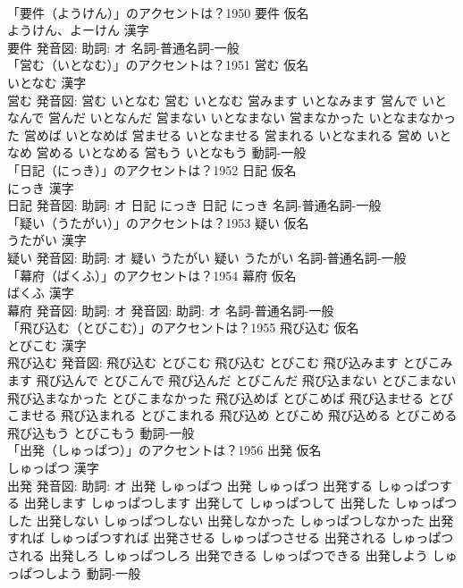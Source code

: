 \documentclass[8pt]{extreport}
\begin{document}
\begin{CJK}{UTF8}{min}
\\	「要件（ようけん）」のアクセントは？1950	要件 仮名　
\\	ようけん、よーけん 漢字　
\\	要件 発音図: 助詞: オ							名詞-普通名詞-一般 
\\	「営む（いとなむ）」のアクセントは？1951	営む 仮名　
\\	いとなむ 漢字　
\\	営む 発音図:	営む いとなむ		営む いとなむ 営みます いとなみます 営んで いとなんで 営んだ いとなんだ 営まない いとなまない 営まなかった いとなまなかった 営めば いとなめば 営ませる いとなませる 営まれる いとなまれる 営め いとなめ 営める いとなめる 営もう いとなもう				動詞-一般 
\\	「日記（にっき）」のアクセントは？1952	日記 仮名　
\\	にっき 漢字　
\\	日記 発音図: 助詞: オ	日記 にっき		日記 にっき				名詞-普通名詞-一般 
\\	「疑い（うたがい）」のアクセントは？1953	疑い 仮名　
\\	うたがい 漢字　
\\	疑い 発音図: 助詞: オ	疑い うたがい		疑い うたがい				名詞-普通名詞-一般 
\\	「幕府（ばくふ）」のアクセントは？1954	幕府 仮名　
\\	ばくふ 漢字　
\\	幕府 発音図: 助詞: オ 発音図: 助詞: オ							名詞-普通名詞-一般 
\\	「飛び込む（とびこむ）」のアクセントは？1955	飛び込む 仮名　
\\	とびこむ 漢字　
\\	飛び込む 発音図:	飛び込む とびこむ		飛び込む とびこむ 飛び込みます とびこみます 飛び込んで とびこんで 飛び込んだ とびこんだ 飛び込まない とびこまない 飛び込まなかった とびこまなかった 飛び込めば とびこめば 飛び込ませる とびこませる 飛び込まれる とびこまれる 飛び込め とびこめ 飛び込める とびこめる 飛び込もう とびこもう				動詞-一般 
\\	「出発（しゅっぱつ）」のアクセントは？1956	出発 仮名　
\\	しゅっぱつ 漢字　
\\	出発 発音図: 助詞: オ	出発 しゅっぱつ		出発 しゅっぱつ 出発する しゅっぱつする 出発します しゅっぱつします 出発して しゅっぱつして 出発した しゅっぱつした 出発しない しゅっぱつしない 出発しなかった しゅっぱつしなかった 出発すれば しゅっぱつすれば 出発させる しゅっぱつさせる 出発される しゅっぱつされる 出発しろ しゅっぱつしろ 出発できる しゅっぱつできる 出発しよう しゅっぱつしよう				動詞-一般 

\end{CJK}
\end{document}
